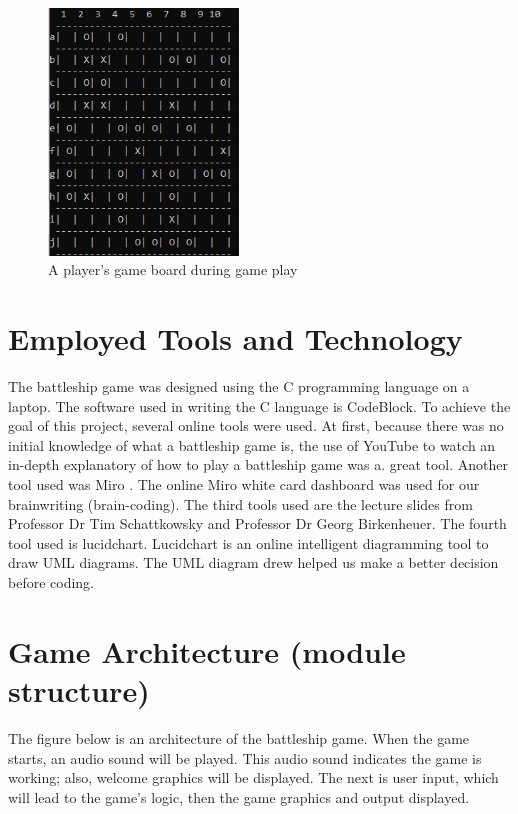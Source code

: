 \documentclass[12pt]{article}
\begin{document}
\begin{figure}[h]
    \centering
    \includegraphics[width=0.45\textwidth]{HEL_template/figures/battleship.jpg}
    \caption{A player's game board during game play }
    \label{battleship game board}
\end{figure}

\section{Employed Tools and Technology}
The battleship game was designed using the C programming language on a laptop. The software used in writing the C language is CodeBlock. To achieve the goal of this project, several online tools were used. At first, because there was no initial knowledge of what a battleship game is, the use of YouTube to watch an in-depth explanatory of how to play a battleship game\cite{a2} was a.  great tool. Another tool used was Miro \cite{a3}. The online Miro white card dashboard was used for our brainwriting (brain-coding). The third tools used are the lecture slides from Professor Dr Tim Schattkowsky and Professor Dr Georg Birkenheuer. The fourth tool used is lucidchart\cite{a4}. Lucidchart is an online intelligent diagramming tool to draw UML diagrams. The UML diagram drew helped us make a better decision before coding. 

\section{Game Architecture (module structure)}
The figure below is an architecture of the battleship game. When the game starts, an audio sound will be played. This audio sound indicates the game is working; also, welcome graphics will be displayed. The next is user input, which will lead to the game's logic, then the game graphics and output displayed.
\end{document}
